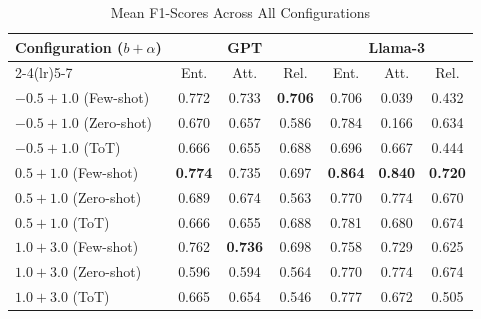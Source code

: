 \begin{table}[t]
\centering
\caption{Mean F1-Scores Across All Configurations}
\label{tab:mean_f1_all}
\setlength{\tabcolsep}{5pt}
\begin{tabular}{l|ccc|ccc}
\toprule
\multirow{2}{*}{Configuration ($b + \alpha$)}
    & \multicolumn{3}{c|}{GPT}
    & \multicolumn{3}{c}{Llama-3} \\
\cmidrule(lr){2-4}\cmidrule(lr){5-7}
    & Ent. & Att. & Rel.
    & Ent. & Att. & Rel. \\
\midrule
$-0.5 + 1.0$ (Few-shot) & 0.772 & 0.733 & \textbf{0.706} & 0.706 & 0.039 & 0.432 \\
$-0.5 + 1.0$ (Zero-shot) & 0.670 & 0.657 & 0.586 & 0.784 & 0.166 & 0.634 \\
$-0.5 + 1.0$ (ToT) & 0.666 & 0.655 & 0.688 & 0.696 & 0.667 & 0.444 \\
\addlinespace
$0.5 + 1.0$ (Few-shot) & \textbf{0.774} & 0.735 & 0.697 & \textbf{0.864} & \textbf{0.840} & \textbf{0.720} \\
$0.5 + 1.0$ (Zero-shot) & 0.689 & 0.674 & 0.563 & 0.770 & 0.774 & 0.670 \\
$0.5 + 1.0$ (ToT) & 0.666 & 0.655 & 0.688 & 0.781 & 0.680 & 0.674 \\
\addlinespace
$1.0 + 3.0$ (Few-shot) & 0.762 & \textbf{0.736} & 0.698 & 0.758 & 0.729 & 0.625 \\
$1.0 + 3.0$ (Zero-shot) & 0.596 & 0.594 & 0.564 & 0.770 & 0.774 & 0.674 \\
$1.0 + 3.0$ (ToT) & 0.665 & 0.654 & 0.546 & 0.777 & 0.672 & 0.505 \\
\bottomrule
\end{tabular}
\end{table}
